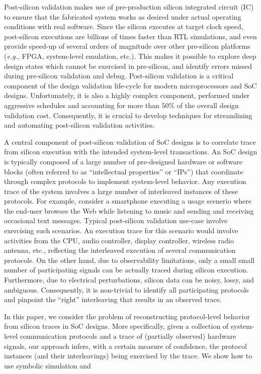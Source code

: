 \documentclass[conference]{IEEEtran}
\newcommand{\eg}{\mbox{{\em e.g.}}}
\begin{document}
Post-silicon validation makes use of pre-production silicon
integrated circuit (IC) to ensure that the fabricated system
works as desired under actual operating conditions with real
software.  Since the silicon executes at target clock speed,
post-silicon executions are billions of times faster than
RTL simulations, and even provide speed-up of several orders
of magnitude over other pre-silicon platforms (\eg, FPGA,
system-level emulation, etc.).  This makes it possible to
explore deep design states which cannot be exercised in
pre-silicon, and identify errors missed during pre-silicon
validation and debug.  Post-silicon validation is a critical
component of the design validation life-cycle for modern
microprocessors and SoC designs.  Unfortunately, it is also
a highly complex component, performed under aggressive
schedules and accounting for more than $50\%$ of the overall
design validation cost.  Consequently, it is crucial to
develop techniques for streamlining and automating
post-silicon validation activities.

A central component of post-silicon validation of SoC
designs is to correlate trace from silicon execution with
the intended system-level transactions.  An SoC design is
typically composed of a large number of pre-designed
hardware or software blocks (often referred to as
``intellectual properties'' or ``IPs'') that coordinate
through complex protocols to implement system-level
behavior.  Any execution trace of the system involves a
large number of interleaved instances of these protocols.
For example, consider a smartphone executing a usage
scenerio where the end-user browses the Web while listening
to music and sending and receiving occasional text messages.
Typical post-silicon validation use-case involve exercising
such scenarios.  An execution trace for this scenario would
involve activities from the CPU, audio controller, display
controller, wireless radio antenna, etc., reflecting the
interleaved execution of several communication protocols.
On the other hand, due to observability limitations, only a
small small number of participating signals can be actually
traced during silicon execution.  Furthermore, due to
electrical perturbations, silicon data can be noisy, lossy,
and ambiguous.  Consequently, it is non-trivial to identify
all participating protocols and pinpoint the ``right''
interleaving that results in an observed trace.

In this paper, we consider the problem of reconstructing
protocol-level behavior from silicon traces in SoC designs.
More specifically, given a collection of system-level
communication protocols and a trace of (partially observed)
hardware signals, our approach infers, with a certain
measure of confidence, the protocol instances (and their
interleavings) being exercised by the trace.  We show how to use symbolic simulation and 
\end{document}
